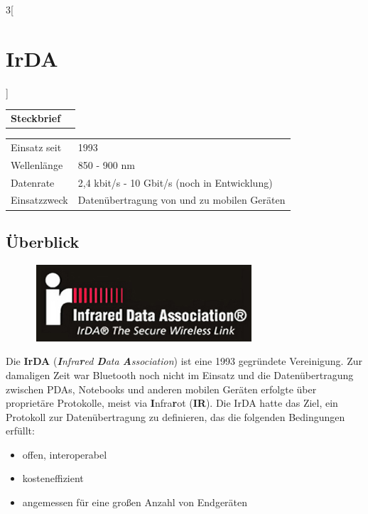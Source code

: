 %
%

\begin{multicols}{3}[\section{IrDA}]


\newrefsegment

\begin{tabular}{p{}p{2.7 cm}}
\textbf{Steckbrief}& \\
\end{tabular}
\begin{tabular}{p{}p{2.7 cm}}
     Einsatz seit & 1993\\
     Wellenlänge  & 850 - 900 nm\\
     Datenrate & 2,4 kbit/s - 10 Gbit/s (noch in Entwicklung) \\
     Einsatzzweck & Datenübertragung von und zu mobilen Geräten \\
\end{tabular}
\par


\subsection*{Überblick}
\begin{figure}
  \vspace{-20pt}
  \begin{center}
  	\hspace{-20pt}
    \includegraphics[width=0.7\linewidth]{Kapitel/IrDA/Grafiken/logo_irda.png}
  \end{center}
  \vspace{-15pt}
\end{figure}
Die \textbf{IrDA} (\textit{\textbf{I}nfra\textbf{r}ed \textbf{D}ata \textbf{A}ssociation}) ist eine 1993 gegründete Vereinigung. Zur damaligen Zeit war Bluetooth noch nicht im Einsatz und die Datenübertragung zwischen PDAs, Notebooks und anderen mobilen Geräten erfolgte über proprietäre Protokolle, meist via \textbf{I}nfra\textbf{r}ot (\textbf{IR}). Die IrDA hatte das Ziel, ein Protokoll zur Datenübertragung zu definieren, das die folgenden Bedingungen erfüllt:
\begin{itemize}
	\item offen, interoperabel
	\item kosteneffizient
	\item angemessen für eine großen Anzahl von Endgeräten~\cite{irdamarketing}
\end{itemize}


\end{multicols}
